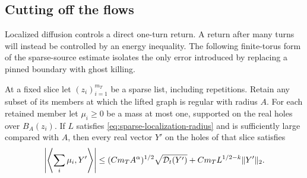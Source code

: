 \subsection{Cutting off the flows}

Localized diffusion controls a direct one-turn return.  A return after
many turns will instead be controlled by an energy inequality.  The
following finite-torus form of the sparse-source estimate isolates the
only error introduced by replacing a pinned boundary with ghost killing.

\begin{lemma}\label{lem:torus-flow-pairing}
At a fixed slice let \((z_i)_{i=1}^{m_T}\) be a sparse list, including
repetitions.  Retain any subset of its members at which the lifted
graph is regular with radius \(A\).  For each retained member let
\(\mu_i\ge0\) be a mass at most one, supported on the real holes
over \(B_A(z_i)\).  If \(L\) satisfies
\eqref{eq:sparse-localization-radius} and is sufficiently large
compared with \(A\), then every real vector \(Y'\) on the holes
of that slice satisfies
\begin{equation}\label{eq:torus-flow-pairing}
 \left|\left\langle\sum_i\mu_i,Y'\right\rangle\right|
 \le (Cm_TA^\alpha)^{1/2}\sqrt{\mathcal D_t(Y')}
      +Cm_TL^{1/2-k}\lVert Y'\rVert_2.
\end{equation}
\end{lemma}

